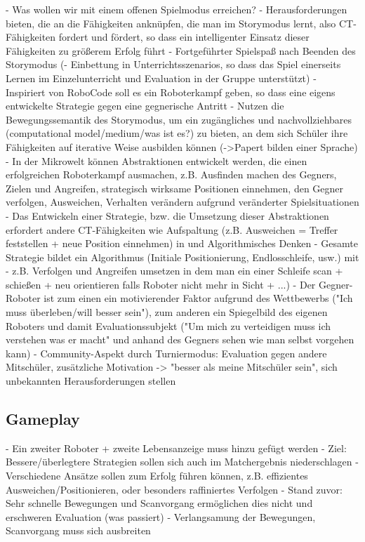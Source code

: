 - Was wollen wir mit einem offenen Spielmodus erreichen?
  - Herausforderungen bieten, die an die Fähigkeiten anknüpfen, die man im Storymodus lernt,
    also CT-Fähigkeiten fordert und fördert, so dass ein intelligenter Einsatz dieser Fähigkeiten zu größerem Erfolg führt
  - Fortgeführter Spielspaß nach Beenden des Storymodus
  (- Einbettung in Unterrichtsszenarios, so dass das Spiel einerseits Lernen im Einzelunterricht und Evaluation in der Gruppe unterstützt)
- Inspiriert von RoboCode soll es ein Roboterkampf geben, so dass eine eigens entwickelte Strategie gegen eine gegnerische Antritt
- Nutzen die Bewegungssemantik des Storymodus, um ein zugängliches und nachvollziehbares (computational model/medium/was ist es?) zu bieten, an dem sich Schüler ihre Fähigkeiten auf iterative Weise ausbilden können (->Papert bilden einer Sprache)
- In der Mikrowelt können Abstraktionen entwickelt werden, die einen erfolgreichen Roboterkampf ausmachen, z.B. Ausfinden machen des Gegners, Zielen und Angreifen, strategisch wirksame Positionen einnehmen, den Gegner verfolgen, Ausweichen, Verhalten verändern aufgrund veränderter Spielsituationen
- Das Entwickeln einer Strategie, bzw. die Umsetzung dieser Abstraktionen erfordert andere CT-Fähigkeiten wie Aufspaltung (z.B. Ausweichen = Treffer feststellen + neue Position einnehmen) in und Algorithmisches Denken
  - Gesamte Strategie bildet ein Algorithmus (Initiale Positionierung, Endlosschleife, usw.) mit 
  - z.B. Verfolgen und Angreifen umsetzen in dem man ein einer Schleife scan + schießen + neu orientieren falls Roboter nicht mehr in Sicht + ...)
- Der Gegner-Roboter ist zum einen ein motivierender Faktor aufgrund des Wettbewerbs ("Ich muss überleben/will besser sein"),
  zum anderen ein Spiegelbild des eigenen Roboters und damit Evaluationssubjekt ("Um mich zu verteidigen muss ich verstehen was er macht" und anhand des Gegners sehen wie man selbst vorgehen kann)
- Community-Aspekt durch Turniermodus: Evaluation gegen andere Mitschüler, zusätzliche Motivation -> "besser als meine Mitschüler sein", sich unbekannten Herausforderungen stellen

\subsection{Gameplay}

- Ein zweiter Roboter + zweite Lebensanzeige muss hinzu gefügt werden
- Ziel: Bessere/überlegtere Strategien sollen sich auch im Matchergebnis niederschlagen
- Verschiedene Ansätze sollen zum Erfolg führen können, z.B. effizientes Ausweichen/Positionieren, oder besonders raffiniertes Verfolgen
- Stand zuvor: Sehr schnelle Bewegungen und Scanvorgang ermöglichen dies nicht und erschweren Evaluation (was passiert)
- Verlangsamung der Bewegungen, Scanvorgang muss sich ausbreiten

